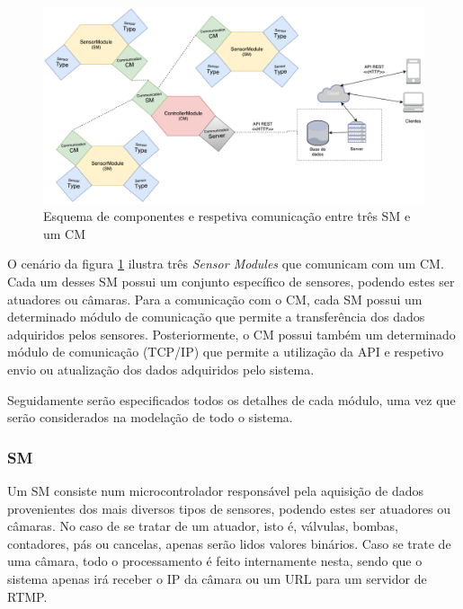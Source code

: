 \begin{figure}[h]
	\centering
	\includegraphics[width=0.9\linewidth]{esquemas/general-electronic-modules.pdf}
	\caption{Esquema de componentes e respetiva comunicação entre três \ac{SM} e um \ac{CM}}
	\label{esquema1}
\end{figure}

O cenário da figura \ref{esquema1} ilustra três \textit{Sensor Modules} que comunicam com um \acl{CM}. Cada um desses \acl{SM} possui um conjunto específico de sensores, podendo estes ser atuadores ou câmaras. Para a comunicação com o \acl{CM}, cada \acl{SM} possui um determinado módulo de comunicação que permite a transferência dos dados adquiridos pelos sensores. Posteriormente, o \acl{CM} possui também um determinado módulo de comunicação (\acs{TCP}/\acs{IP}) que permite a utilização da \ac{API} e respetivo envio ou atualização dos dados adquiridos pelo sistema. 





Seguidamente serão especificados todos os detalhes de cada módulo, uma vez que serão considerados na modelação de todo o sistema. 



\subsubsection{\acl{SM}}



Um \acl{SM} consiste num microcontrolador responsável pela aquisição de dados provenientes dos mais diversos tipos de sensores, podendo estes ser atuadores ou câmaras. No caso de se tratar de um atuador, isto é, válvulas, bombas, contadores, pás ou cancelas, apenas serão lidos valores binários. Caso se trate de uma câmara, todo o processamento é feito internamente nesta, sendo que o sistema apenas irá receber o \ac{IP} da câmara ou um \ac{URL} para um servidor de \ac{RTMP}.  


